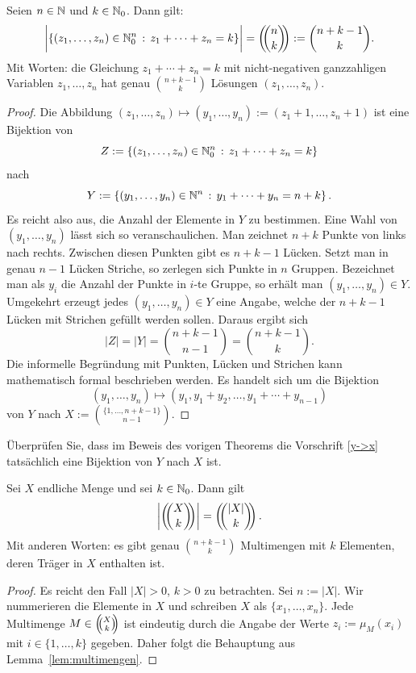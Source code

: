\begin{lem} \label{lem:multimengen}
	Seien $n \in \mathbb{N}$ und $k \in \mathbb{N}_0$. Dann gilt: 
	\[
		\biggl| \left\{  (z_1,\ldots,z_n) \in \mathbb{N}_0^n \,:\, z_1 + \cdots + z_n = k \right\} \biggr| = \left(\!\!\binom{n}{k}\!\!\right) := \binom{n+k-1}{k}. 
	\]
	Mit Worten: die Gleichung $z_1 + \cdots + z_n = k$ mit nicht-negativen ganzzahligen Variablen $z_1,\ldots,z_n$ hat genau $\binom{n+k-1}{k}$ Lösungen $(z_1,\ldots,z_n)$. 
\end{lem} 
\begin{proof} 
	Die Abbildung $(z_1,\ldots,z_n) \mapsto (y_1,\ldots,y_n):=(z_1+1,\ldots,z_n+1)$ ist eine Bijektion von 
	\[
			Z:=\left\{  (z_1,\ldots,z_n) \in \mathbb{N}_0^n \,:\, z_1 + \cdots + z_n = k \right\}
	\]
	nach 
	\[
			Y:= \left\{  (y_1,\ldots,y_n) \in \mathbb{N}^n \,:\, y_1 + \cdots + y_n = n+ k \right\}. 
	\]
	Es reicht also aus, die Anzahl der Elemente in $Y$ zu bestimmen. Eine Wahl von $(y_1,\ldots,y_n)$ lässt sich so veranschaulichen. Man zeichnet $n+k$ Punkte von links nach rechts. Zwischen diesen Punkten gibt es $n+k-1$ Lücken. Setzt man in genau $n-1$ Lücken Striche, so zerlegen sich Punkte in $n$ Gruppen. Bezeichnet man als $y_i$ die Anzahl der Punkte in $i$-te Gruppe, so erhält man $(y_1,\ldots,y_n) \in Y$. Umgekehrt erzeugt jedes $(y_1,\ldots,y_n) \in Y$ eine Angabe, welche der $n+k-1$ Lücken mit Strichen gefüllt werden sollen. Daraus ergibt sich 
	\[
			|Z| = |Y|= \binom{n+k-1}{n-1} = \binom{n+k-1}{k}. 
	\]
	Die informelle Begründung mit Punkten, Lücken und Strichen kann mathematisch formal beschrieben werden. Es handelt sich um die Bijektion 
	\begin{equation}\label{y->x}
		(y_1,\ldots,y_n) \mapsto (y_1,y_1+y_2,\ldots, y_1+ \cdots +y_{n-1})
	\end{equation}
	 von $Y$ nach 
	\(
			X:=\binom{\{1,\ldots,n+k-1\}}{n-1}. 
	\)
\end{proof} 

\begin{aufg}
	Überprüfen Sie, dass im Beweis des vorigen Theorems die Vorschrift \eqref{y->x} tatsächlich eine Bijektion von $Y$ nach $X$ ist. 
\end{aufg} 

\begin{thm}
	Sei $X$ endliche Menge und sei $k \in \mathbb{N}_0$. Dann gilt 
	\[
			\left| \mbinom{X}{k} \right| = \mbinom{|X|}{k}. 
	\]
	Mit anderen Worten: es gibt genau $\binom{n+k-1}{k}$ Multimengen mit $k$ Elementen, deren Träger in $X$ enthalten ist. 
\end{thm}
\begin{proof}
	Es reicht den Fall $|X| >0$, $k>0$ zu betrachten. Sei $n:= |X|$. Wir nummerieren die Elemente in $X$ und schreiben $X$ als $\{x_1,\ldots,x_n\}$. Jede Multimenge $M \in \left(\!\!\binom{X}{k}\!\!\right)$ ist eindeutig durch die Angabe der Werte $z_i := \mu_M(x_i)$ mit $i \in \{1,\ldots,k\}$ gegeben. Daher folgt die Behauptung aus Lemma~\ref{lem:multimengen}. 
\end{proof} 

